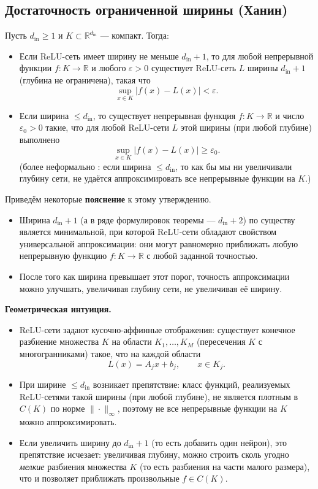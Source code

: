 \documentclass[../NDCNNAI_main.tex]{subfiles}
\begin{document}
\subsection{Достаточность ограниченной ширины (Ханин)}

\begin{theorem}
Пусть $d_{\mathrm{in}}\ge 1$ и $K\subset \mathbb{R}^{d_{\mathrm{in}}}$ --- компакт. Тогда:
\begin{itemize}
  \item Если ReLU-сеть имеет ширину не меньше $d_{\mathrm{in}}+1$, то для любой непрерывной функции
  $f\colon K\to \mathbb{R}$ и любого $\varepsilon>0$ существует ReLU-сеть $L$ ширины $d_{\mathrm{in}}+1$
  (глубина не ограничена), такая что
  $$
  \sup_{x\in K} |f(x)-L(x)|<\varepsilon.
  $$
  \item Если ширина $\le d_{\mathrm{in}}$, то существует непрерывная функция $f\colon K\to\mathbb{R}$ и число
  $\varepsilon_0>0$ такие, что для любой ReLU-сети $L$ этой ширины (при любой глубине) выполнено
  $$
  \sup_{x\in K}|f(x)-L(x)|\ge \varepsilon_0.
  $$
  (более неформально : если ширина $\le d_{\mathrm{in}}$, то как бы мы ни увеличивали глубину сети,
  не удаётся аппроксимировать все непрерывные функции на $K$.)
\end{itemize}
\end{theorem}


Приведём некоторые \textbf{пояснение} к этому утверждению.
\begin{itemize}
  \item Ширина $d_{\mathrm{in}}+1$ (а в ряде формулировок теоремы --- $d_{\mathrm{in}}+2$) по существу является минимальной,
  при которой ReLU-сети обладают свойством универсальной аппроксимации:
  они могут равномерно приближать любую непрерывную функцию $f\colon K\to\mathbb{R}$ с любой заданной точностью.
  \item После того как ширина превышает этот порог, точность аппроксимации можно улучшать, увеличивая глубину сети,
  не увеличивая её ширину.
\end{itemize}

\textbf{Геометрическая интуиция.}
\begin{itemize}
  \item ReLU-сети задают кусочно-аффинные отображения: существует конечное разбиение множества $K$ на области
  $K_1,\dots,K_M$ (пересечения $K$ с многогранниками) такое, что на каждой области
  $$
  L(x)=A_jx+b_j,\qquad x\in K_j.
  $$
  \item При ширине $\le d_{\mathrm{in}}$ возникает препятствие:
  класс функций, реализуемых ReLU-сетями такой ширины (при любой глубине), не является плотным в $C(K)$ по норме
  $\|\cdot\|_\infty$, поэтому не все непрерывные функции на $K$ можно аппроксимировать.
  \item Если увеличить ширину до $d_{\mathrm{in}}+1$ (то есть добавить один нейрон),
  это препятствие исчезает: увеличивая глубину, можно строить сколь угодно \emph{мелкие} разбиения множества $K$
(то есть разбиения на части малого размера), что и позволяет приближать произвольные
$f\in C(K)$.

\end{itemize}
\end{document}

